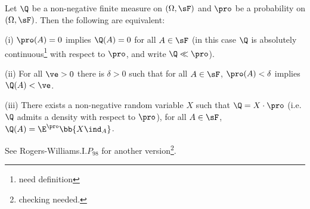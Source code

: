 \begin{theorem}\label{thm:radon_nikodym_discrete}%
Let $\Q$ be a non-negative finite measure on $(\Omega,\sF)$ and $\pro$ be a probability on $(\Omega,\sF)$. Then the following are equivalent:
\ben
\item [(i)] $\pro(A) = 0$ implies $\Q(A) = 0$ for all $A \in \sF$ (in this case $\Q$ is absolutely continuous\footnote{need definition} with respect to $\pro$, and write $\Q \ll \pro$).
\item [(ii)] For all $\ve > 0$ there is $\delta > 0$ such that for all $A \in \sF$, $\pro(A) < \delta$ implies $\Q(A) < \ve$.
\item [(iii)] There exists a non-negative random variable $X$ such that $\Q = X \cdot \pro$ (i.e. $\Q$ admits a density with respect to $\pro$), for all $A\in \sF$, $\Q(A) = \E^\pro\bb{X\ind_A}$.
\een
\end{theorem}

\begin{remark}
See Rogers-Williams\cite{Rogers_1994}.I.$P_{98}$ for another version\footnote{checking needed.}.
\end{remark}

